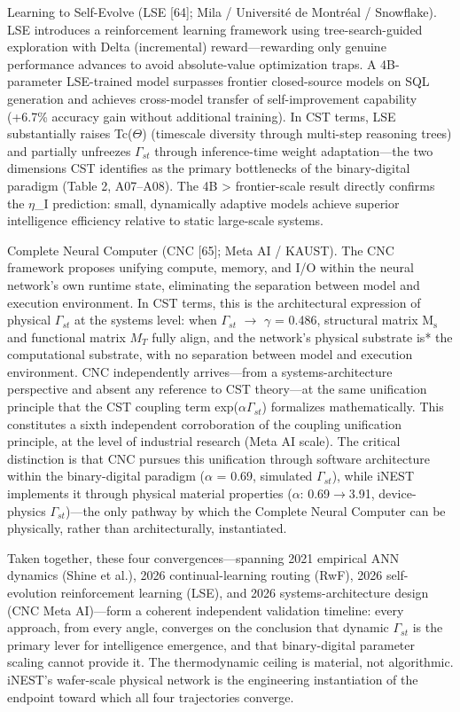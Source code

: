 \documentclass[a4paper,12pt]{article}
\providecommand{\textsubscript}[1]{\ensuremath{_{\text{#1}}}}
\begin{document}
Learning to Self-Evolve (LSE [64]; Mila / Universit\'e de Montr\'eal / Snowflake).
LSE introduces a reinforcement learning framework using tree-search-guided exploration with Delta (incremental) reward---rewarding only genuine performance advances to avoid absolute-value optimization traps.
A 4B-parameter LSE-trained model surpasses frontier closed-source models on SQL generation and achieves cross-model transfer of self-improvement capability (+6.7\% accuracy gain without additional training).
In CST terms, LSE substantially raises Tc($\Theta$) (timescale diversity through multi-step reasoning trees) and partially unfreezes $\Gamma_{st}$ through inference-time weight adaptation---the two dimensions CST identifies as the primary bottlenecks of the binary-digital paradigm (Table 2, A07--A08).
The 4B > frontier-scale result directly confirms the $\eta$_I prediction: small, dynamically adaptive models achieve superior intelligence efficiency relative to static large-scale systems.


Complete Neural Computer (CNC [65]; Meta AI / KAUST).
The CNC framework proposes unifying compute, memory, and I/O within the neural network's own runtime state, eliminating the separation between model and execution environment.
In CST terms, this is the architectural expression of physical $\Gamma_{st}$ at the systems level: when $\Gamma_{st}$ $\rightarrow$ $\gamma$ = 0.486, structural matrix M\textsubscript{s} and functional matrix $M_{T}$ fully align, and the network's physical substrate is* the computational substrate, with no separation between model and execution environment.
CNC independently arrives---from a systems-architecture perspective and absent any reference to CST theory---at the same unification principle that the CST coupling term exp($\alpha$\cdot$\Gamma_{st}$) formalizes mathematically.
This constitutes a sixth independent corroboration of the coupling unification principle, at the level of industrial research (Meta AI scale).
The critical distinction is that CNC pursues this unification through software architecture within the binary-digital paradigm ($\alpha$ = 0.69, simulated $\Gamma_{st}$), while iNEST implements it through physical material properties ($\alpha$: 0.69$\rightarrow$3.91, device-physics $\Gamma_{st}$)---the only pathway by which the Complete Neural Computer can be physically, rather than architecturally, instantiated.


Taken together, these four convergences---spanning 2021 empirical ANN dynamics (Shine et al.), 2026 continual-learning routing (RwF), 2026 self-evolution reinforcement learning (LSE), and 2026 systems-architecture design (CNC Meta AI)---form a coherent independent validation timeline: every approach, from every angle, converges on the conclusion that dynamic $\Gamma_{st}$ is the primary lever for intelligence emergence, and that binary-digital parameter scaling cannot provide it.
The thermodynamic ceiling is material, not algorithmic. iNEST's wafer-scale physical network is the engineering instantiation of the endpoint toward which all four trajectories converge.
\end{document}
